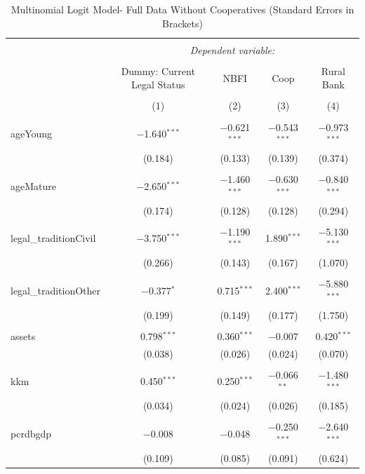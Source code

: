 \documentclass[a4paper, nobind]{templates/ociamthesis}
\begin{document}
\begin{table}[!htbp] \centering 
  \caption{Multinomial Logit Model- Full Data Without Cooperatives (Standard Errors in Brackets)} 
  \label{} 
\footnotesize 
\begin{tabular}{@{\extracolsep{5pt}}lcccc} 
\\[-1.8ex]\hline 
\hline \\[-1.8ex] 
 & \multicolumn{4}{c}{\textit{Dependent variable:}} \\ 
\cline{2-5} 
\\[-1.8ex] & Dummy: Current Legal Status & NBFI & Coop & Rural Bank \\ 
\\[-1.8ex] & (1) & (2) & (3) & (4)\\ 
\hline \\[-1.8ex] 
 ageYoung & $-$1.640$^{***}$ & $-$0.621$^{***}$ & $-$0.543$^{***}$ & $-$0.973$^{***}$ \\ 
  & (0.184) & (0.133) & (0.139) & (0.374) \\ 
  & & & & \\ 
 ageMature & $-$2.650$^{***}$ & $-$1.460$^{***}$ & $-$0.630$^{***}$ & $-$0.840$^{***}$ \\ 
  & (0.174) & (0.128) & (0.128) & (0.294) \\ 
  & & & & \\ 
 legal\_traditionCivil & $-$3.750$^{***}$ & $-$1.190$^{***}$ & 1.890$^{***}$ & $-$5.130$^{***}$ \\ 
  & (0.266) & (0.143) & (0.167) & (1.070) \\ 
  & & & & \\ 
 legal\_traditionOther & $-$0.377$^{*}$ & 0.715$^{***}$ & 2.400$^{***}$ & $-$5.880$^{***}$ \\ 
  & (0.199) & (0.149) & (0.177) & (1.750) \\ 
  & & & & \\ 
 assets & 0.798$^{***}$ & 0.360$^{***}$ & $-$0.007 & 0.420$^{***}$ \\ 
  & (0.038) & (0.026) & (0.024) & (0.070) \\ 
  & & & & \\ 
 kkm & 0.450$^{***}$ & 0.250$^{***}$ & $-$0.066$^{**}$ & $-$1.480$^{***}$ \\ 
  & (0.034) & (0.024) & (0.026) & (0.185) \\ 
  & & & & \\ 
 pcrdbgdp & $-$0.008 & $-$0.048 & $-$0.250$^{***}$ & $-$2.640$^{***}$ \\ 
  & (0.109) & (0.085) & (0.091) & (0.624) \\ 

\end{tabular}
\end{table}
\end{document}
